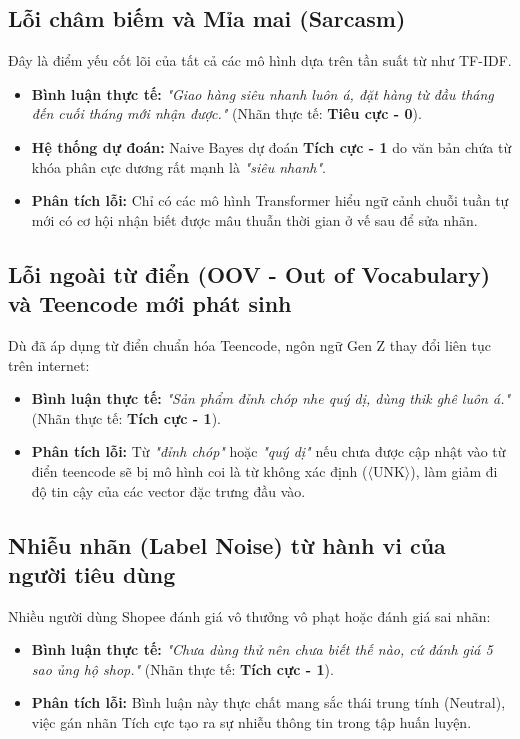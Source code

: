 \documentclass[12pt,a4paper]{article}
\begin{document}
\subsection{Lỗi châm biếm và Mỉa mai (Sarcasm)}
Đây là điểm yếu cốt lõi của tất cả các mô hình dựa trên tần suất từ như TF-IDF.
\begin{itemize}
    \item \textbf{Bình luận thực tế:} \textit{"Giao hàng siêu nhanh luôn á, đặt hàng từ đầu tháng đến cuối tháng mới nhận được."} (Nhãn thực tế: \textbf{Tiêu cực - 0}).
    \item \textbf{Hệ thống dự đoán:} Naive Bayes dự đoán \textbf{Tích cực - 1} do văn bản chứa từ khóa phân cực dương rất mạnh là \textit{"siêu nhanh"}. 
    \item \textbf{Phân tích lỗi:} Chỉ có các mô hình Transformer hiểu ngữ cảnh chuỗi tuần tự mới có cơ hội nhận biết được mâu thuẫn thời gian ở vế sau để sửa nhãn.
\end{itemize}

\subsection{Lỗi ngoài từ điển (OOV - Out of Vocabulary) và Teencode mới phát sinh}
Dù đã áp dụng từ điển chuẩn hóa Teencode, ngôn ngữ Gen Z thay đổi liên tục trên internet:
\begin{itemize}
    \item \textbf{Bình luận thực tế:} \textit{"Sản phẩm đỉnh chóp nhe quý dị, dùng thik ghê luôn á."} (Nhãn thực tế: \textbf{Tích cực - 1}).
    \item \textbf{Phân tích lỗi:} Từ \textit{"đỉnh chóp"} hoặc \textit{"quý dị"} nếu chưa được cập nhật vào từ điển teencode sẽ bị mô hình coi là từ không xác định ($\langle\text{UNK}\rangle$), làm giảm đi độ tin cậy của các vector đặc trưng đầu vào.
\end{itemize}

\subsection{Nhiễu nhãn (Label Noise) từ hành vi của người tiêu dùng}
Nhiều người dùng Shopee đánh giá vô thưởng vô phạt hoặc đánh giá sai nhãn:
\begin{itemize}
    \item \textbf{Bình luận thực tế:} \textit{"Chưa dùng thử nên chưa biết thế nào, cứ đánh giá 5 sao ủng hộ shop."} (Nhãn thực tế: \textbf{Tích cực - 1}).
    \item \textbf{Phân tích lỗi:} Bình luận này thực chất mang sắc thái trung tính (Neutral), việc gán nhãn Tích cực tạo ra sự nhiễu thông tin trong tập huấn luyện.
\end{itemize}
\end{document}
